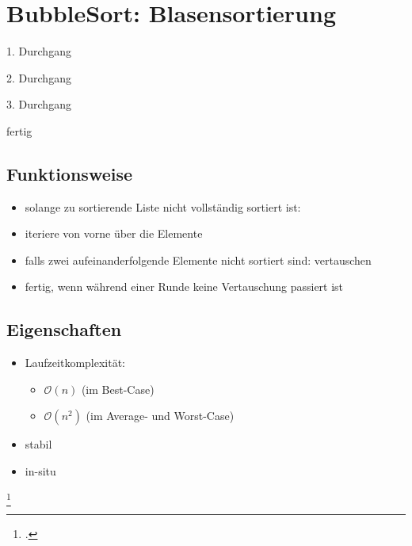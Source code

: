 \documentclass{lehramt-informatik-haupt}
\begin{document}

\chapter{BubbleSort: Blasensortierung}

\begin{quellen}
\item \cite[Seite 43]{aud:fs:tafeluebung-11}
\item \cite[Seite 129-131 (PDF 147-149)]{saake}
\item \cite{wiki:bubblesort}
\end{quellen}


1. Durchgang




2. Durchgang



3. Durchgang


fertig


\section{Funktionsweise}

\begin{itemize}
\item solange zu sortierende Liste nicht vollständig sortiert ist:
\item iteriere von vorne über die Elemente
\item falls zwei aufeinanderfolgende Elemente nicht sortiert sind: vertauschen
\item fertig, wenn während einer Runde keine Vertauschung passiert ist
\end{itemize}

\section{Eigenschaften}

\begin{itemize}
\item Laufzeitkomplexität:

\begin{itemize}
\item $\mathcal{O}(n)$ (im Best-Case)
\item $\mathcal{O}(n^2)$ (im Average- und Worst-Case)
\end{itemize}

\item stabil
\item in-situ
\end{itemize}


\footcite[Seite 130-131 (PDF 148-149)]{saake}

\literatur
\end{document}

